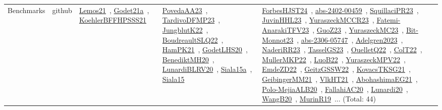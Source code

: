 {\begin{longtable}{lp{3cm}>{\raggedright\arraybackslash}p{6cm}>{\raggedright\arraybackslash}p{6cm}>{\raggedright\arraybackslash}p{8cm}}
Benchmarks & github & \href{../works/Lemos21.pdf}{Lemos21}~\cite{Lemos21}, \href{../works/Godet21a.pdf}{Godet21a}~\cite{Godet21a}, \href{../works/KoehlerBFFHPSSS21.pdf}{KoehlerBFFHPSSS21}~\cite{KoehlerBFFHPSSS21} & \href{../works/PovedaAA23.pdf}{PovedaAA23}~\cite{PovedaAA23}, \href{../works/TardivoDFMP23.pdf}{TardivoDFMP23}~\cite{TardivoDFMP23}, \href{../works/JungblutK22.pdf}{JungblutK22}~\cite{JungblutK22}, \href{../works/BoudreaultSLQ22.pdf}{BoudreaultSLQ22}~\cite{BoudreaultSLQ22}, \href{../works/HamPK21.pdf}{HamPK21}~\cite{HamPK21}, \href{../works/GodetLHS20.pdf}{GodetLHS20}~\cite{GodetLHS20}, \href{../works/BenediktMH20.pdf}{BenediktMH20}~\cite{BenediktMH20}, \href{../works/LunardiBLRV20.pdf}{LunardiBLRV20}~\cite{LunardiBLRV20}, \href{../works/Siala15a.pdf}{Siala15a}~\cite{Siala15a}, \href{../works/Siala15.pdf}{Siala15}~\cite{Siala15} & \href{../works/ForbesHJST24.pdf}{ForbesHJST24}~\cite{ForbesHJST24}, \href{../works/abs-2402-00459.pdf}{abs-2402-00459}~\cite{abs-2402-00459}, \href{../works/SquillaciPR23.pdf}{SquillaciPR23}~\cite{SquillaciPR23}, \href{../works/JuvinHHL23.pdf}{JuvinHHL23}~\cite{JuvinHHL23}, \href{../works/YuraszeckMCCR23.pdf}{YuraszeckMCCR23}~\cite{YuraszeckMCCR23}, \href{../works/Fatemi-AnarakiTFV23.pdf}{Fatemi-AnarakiTFV23}~\cite{Fatemi-AnarakiTFV23}, \href{../works/GuoZ23.pdf}{GuoZ23}~\cite{GuoZ23}, \href{../works/YuraszeckMC23.pdf}{YuraszeckMC23}~\cite{YuraszeckMC23}, \href{../works/Bit-Monnot23.pdf}{Bit-Monnot23}~\cite{Bit-Monnot23}, \href{../works/abs-2306-05747.pdf}{abs-2306-05747}~\cite{abs-2306-05747}, \href{../works/Adelgren2023.pdf}{Adelgren2023}~\cite{Adelgren2023}, \href{../works/NaderiRR23.pdf}{NaderiRR23}~\cite{NaderiRR23}, \href{../works/TasselGS23.pdf}{TasselGS23}~\cite{TasselGS23}, \href{../works/OuelletQ22.pdf}{OuelletQ22}~\cite{OuelletQ22}, \href{../works/ColT22.pdf}{ColT22}~\cite{ColT22}, \href{../works/MullerMKP22.pdf}{MullerMKP22}~\cite{MullerMKP22}, \href{../works/LuoB22.pdf}{LuoB22}~\cite{LuoB22}, \href{../works/YuraszeckMPV22.pdf}{YuraszeckMPV22}~\cite{YuraszeckMPV22}, \href{../works/EmdeZD22.pdf}{EmdeZD22}~\cite{EmdeZD22}, \href{../works/GeitzGSSW22.pdf}{GeitzGSSW22}~\cite{GeitzGSSW22}, \href{../works/KovacsTKSG21.pdf}{KovacsTKSG21}~\cite{KovacsTKSG21}, \href{../works/GeibingerMM21.pdf}{GeibingerMM21}~\cite{GeibingerMM21}, \href{../works/VlkHT21.pdf}{VlkHT21}~\cite{VlkHT21}, \href{../works/AbohashimaEG21.pdf}{AbohashimaEG21}~\cite{AbohashimaEG21}, \href{../works/Polo-MejiaALB20.pdf}{Polo-MejiaALB20}~\cite{Polo-MejiaALB20}, \href{../works/FallahiAC20.pdf}{FallahiAC20}~\cite{FallahiAC20}, \href{../works/Lunardi20.pdf}{Lunardi20}~\cite{Lunardi20}, \href{../works/WangB20.pdf}{WangB20}~\cite{WangB20}, \href{../works/MurinR19.pdf}{MurinR19}~\cite{MurinR19}... (Total: 44)\\

\end{longtable}}
